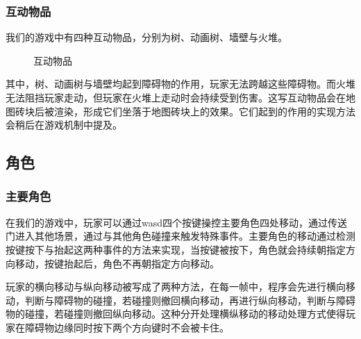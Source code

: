 \documentclass{ctexart}
\begin{document}
\subsubsection{互动物品}
我们的游戏中有四种互动物品，分别为树、动画树、墙壁与火堆。
\begin{figure}[h]
\centering
{}
\caption{\label{fig:互动物品}互动物品}
\end{figure}

其中，树、动画树与墙壁均起到障碍物的作用，玩家无法跨越这些障碍物。而火堆无法阻挡玩家走动，但玩家在火堆上走动时会持续受到伤害。这写互动物品会在地图砖块后被渲染，形成它们坐落于地图砖块上的效果。它们起到的作用的实现方法会稍后在游戏机制中提及。

\subsection{角色}
\subsubsection{主要角色}
在我们的游戏中，玩家可以通过wasd四个按键操控主要角色四处移动，通过传送门进入其他场景，通过与其他角色碰撞来触发特殊事件。主要角色的移动通过检测按键按下与抬起这两种事件的方法来实现，当按键被按下，角色就会持续朝指定方向移动，按键抬起后，角色不再朝指定方向移动。

玩家的横向移动与纵向移动被写成了两种方法，在每一帧中，程序会先进行横向移动，判断与障碍物的碰撞，若碰撞则撤回横向移动，再进行纵向移动，判断与障碍物的碰撞，若碰撞则撤回纵向移动。这种分开处理横纵移动的移动处理方式使得玩家在障碍物边缘同时按下两个方向键时不会被卡住。
\end{document}
